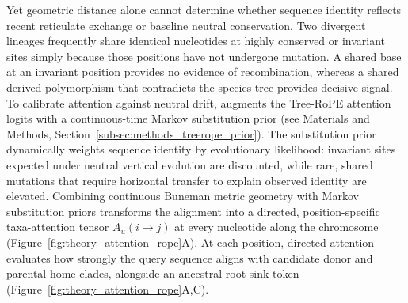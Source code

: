 Yet geometric distance alone cannot determine whether sequence identity reflects recent reticulate exchange or baseline neutral conservation.
Two divergent lineages frequently share identical nucleotides at highly conserved or invariant sites simply because those positions have not undergone mutation.
A shared base at an invariant position provides no evidence of recombination, whereas a shared derived polymorphism that contradicts the species tree provides decisive signal.
To calibrate attention against neutral drift, \RhizAeon augments the Tree-RoPE attention logits with a continuous-time Markov substitution prior (see Materials and Methods, Section~\ref{subsec:methods_treerope_prior}).
The substitution prior dynamically weights sequence identity by evolutionary likelihood: invariant sites expected under neutral vertical evolution are discounted, while rare, shared mutations that require horizontal transfer to explain observed identity are elevated.
Combining continuous Buneman metric geometry with Markov substitution priors transforms the alignment into a directed, position-specific taxa-attention tensor $A_u(i \to j)$ at every nucleotide along the chromosome (Figure~\ref{fig:theory_attention_rope}A).
At each position, directed attention evaluates how strongly the query sequence aligns with candidate donor and parental home clades, alongside an ancestral root sink token (Figure~\ref{fig:theory_attention_rope}A,C).

